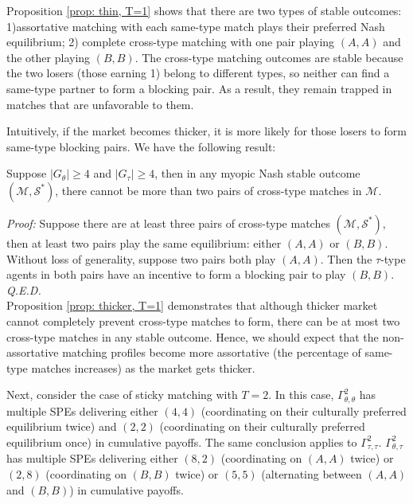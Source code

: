 \documentclass{myPaper}
\begin{document}
Proposition \ref{prop: thin, T=1} shows that there are two types of stable outcomes: 1)assortative matching with each same-type match plays their preferred Nash equilibrium; 2) complete cross-type matching with one pair playing $(A, A)$ and the other playing $(B, B)$. The cross-type matching outcomes are stable because the two losers (those earning 1) belong to different types, so neither can find a same-type partner to form a blocking pair. As a result, they remain trapped in matches that are unfavorable to them.

Intuitively, if the market becomes thicker, it is more likely for those losers to form same-type blocking pairs. We have the following result:

\begin{proposition} \label{prop: thicker, T=1}
Suppose $|G_\theta|\ge 4$ and $|G_\tau|\ge 4$, then in any myopic Nash stable outcome $(\mathcal{M}, \mathcal{S}^*)$, there cannot be more than two pairs of cross-type matches in $\mathcal{M}$.  \end{proposition}
\noindent \textit{Proof:} Suppose there are at least three pairs of cross-type matches $(\mathcal{M}, \mathcal{S}^*)$, then at least two pairs play the same equilibrium: either $(A, A)$ or $(B, B)$. Without loss of generality, suppose two pairs both play $(A, A)$. Then the $\tau$-type agents in both pairs have an incentive to form a blocking pair to play $(B, B)$. \textit{Q.E.D.}
\\

Proposition \ref{prop: thicker, T=1} demonstrates that although thicker market cannot completely prevent cross-type matches to form, there can be at most two cross-type matches in any stable outcome. Hence, we should expect that the non-assortative matching profiles become more assortative (the percentage of same-type matches increases) as the market gets thicker. 

Next, consider the case of sticky matching with $T=2$. In this case, $\Gamma_{\theta, \theta}^2$ has multiple SPEs delivering either $(4, 4)$ (coordinating on their culturally preferred equilibrium twice) and $(2, 2)$ (coordinating on their culturally preferred equilibrium once) in cumulative payoffs. The same conclusion applies to  $\Gamma_{\tau,\tau}^2$. $\Gamma_{\theta,\tau}^2$ has multiple SPEs delivering either $(8, 2)$ (coordinating on $(A, A)$ twice) or $(2, 8)$ (coordinating on $(B, B)$ twice) or $(5, 5)$ (alternating between $(A, A)$ and $(B, B)$) in cumulative payoffs.
\end{document}
